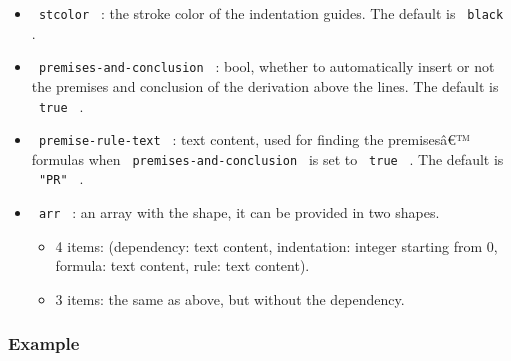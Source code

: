 \begin{itemize}
\tightlist
\item
  \texttt{\ stcolor\ } : the stroke color of the indentation guides. The
  default is \texttt{\ black\ } .
\item
  \texttt{\ premises-and-conclusion\ } : bool, whether to automatically
  insert or not the premises and conclusion of the derivation above the
  lines. The default is \texttt{\ true\ } .
\item
  \texttt{\ premise-rule-text\ } : text content, used for finding the
  premisesâ€™ formulas when \texttt{\ premises-and-conclusion\ } is set
  to \texttt{\ true\ } . The default is \texttt{\ "PR"\ } .
\item
  \texttt{\ arr\ } : an array with the shape, it can be provided in two
  shapes.

  \begin{itemize}
  \tightlist
  \item
    4 items: (dependency: text content, indentation: integer starting
    from 0, formula: text content, rule: text content).
  \item
    3 items: the same as above, but without the dependency.
  \end{itemize}
\end{itemize}

\subsubsection{Example}\label{example}

